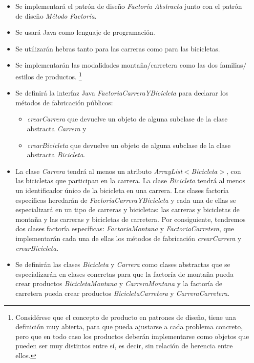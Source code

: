 \documentclass{article} %
\begin{document}
    \begin{itemize}
        \item Se implementará el patrón de diseño \textit{Factoría Abstracta} junto con el patrón de diseño \textit{Método Factoría}.
        \item Se usará Java como lenguaje de programación.
        \item Se utilizarán hebras tanto para las carreras como para las bicicletas.
        \item Se implementarán las modalidades montaña/carretera como las dos familias$/$estilos de productos.
                \footnote{Considérese que el concepto de producto en patrones de diseño, tiene una definición muy abierta, para
                            que pueda ajustarse a cada problema concreto, pero que en todo caso los productos deberán implementarse
                            como objetos que pueden ser muy distintos entre sí, es decir, sin relación de herencia entre ellos.}
        \item Se definirá la interfaz Java \textit{FactoriaCarreraYBicicleta} para declarar los métodos de
                fabricación públicos:
            \begin{itemize}
                \item \textit{crearCarrera} que devuelve un objeto de alguna subclase de la clase abstracta \textit{Carrera} y
                \item \textit{crearBicicleta} que devuelve un objeto de alguna subclase de la clase abstracta \textit{Bicicleta}.
            \end{itemize}
        \item La clase \textit{Carrera} tendrá al menos un atributo \textit{ArrayList$<$Bicicleta$>$}, con las bicicletas
                que participan en la carrera. La clase \textit{Bicicleta} tendrá al menos un identificador único
                de la bicicleta en una carrera. Las clases factoría específicas heredarán de \textit{FactoriaCarreraYBicicleta} 
                y cada una de ellas se especializará en un tipo de carreras y bicicletas: las carreras y bicicletas de montaña y 
                las carreras y bicicletas de carretera. Por consiguiente, tendremos dos clases factoría específicas: \textit{FactoriaMontana} y
                \textit{FactoriaCarretera}, que implementarán cada una de ellas los métodos de fabricación \textit{crearCarrera} y \textit{crearBicicleta}.
        \item Se definirán las clases \textit{Bicicleta} y \textit{Carrera} como clases abstractas que se especializarán en clases concretas para que la 
                factoría de montaña pueda crear productos \textit{BicicletaMontana} y \textit{CarreraMontana} y la factoría de carretera pueda crear productos
                \textit{BicicletaCarretera} y \textit{CarreraCarretera}.
    \end{itemize}
    
\end{document}
